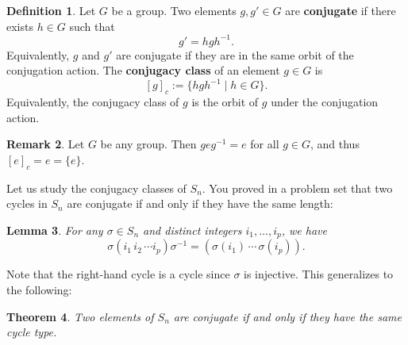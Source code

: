 \documentclass[12pt]{report}
\newtheorem{theorem}{Theorem}[chapter]
\newtheorem{lemma}[theorem]{Lemma}
\numberwithin{equation}{section}
\numberwithin{theorem}{chapter}
\theoremstyle{definition}
\newtheorem{definition}[theorem]{Definition}
\newtheorem*{basic properties}{Basic Properties}
\newtheorem*{Important Remark}{Important Remark}
\newtheorem{remark}[theorem]{Remark}
\newcommand{\df}[1]{{\bf #1}\index{#1}}
\begin{document}
\begin{definition}
Let $G$ be a group. Two elements $g,g' \in G$ are {\bf conjugate} if there exists $h \in G$ such that 
$$g' = hgh^{-1}.$$
Equivalently, $g$ and $g'$ are conjugate if they are in the same orbit of the conjugation action. The \df{conjugacy class} of an element $g \in G$ is 
$$[g]_c := \{hgh^{-1} \mid h \in G\}.$$ 
Equivalently, the conjugacy class of $g$ is the orbit of $g$ under the conjugation action. 
\end{definition}


\begin{remark}
	Let $G$ be any group. Then $geg^{-1} = e$ for all $g \in G$, and thus $[e]_c=e = \{ e \}$.
\end{remark}

Let us study the conjugacy classes of $S_n$. You proved in a problem set that two cycles in $S_n$ are conjugate if and only if they have the same length:

\begin{lemma}\label{lemma conjugates cycles} 
For any $\sigma \in S_n$ and distinct integers $i_1, \dots, i_p$, we have
$$\sigma (i_1 \, i_2 \, \cdots i_p) \sigma^{-1} = (\sigma(i_1) \, \cdots \, \sigma(i_p)).$$
\end{lemma}

Note that the right-hand cycle is a cycle since $\sigma$ is injective. This generalizes to the following:

\begin{theorem}\label{conjugates S_n}
Two elements of $S_n$ are conjugate if and only if they have the same cycle type. 
\end{theorem}

\end{document}
